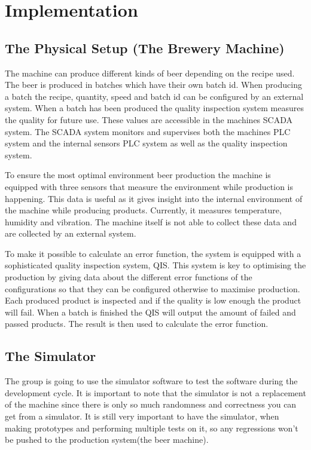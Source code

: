 \section{Implementation}
\subsection{The Physical Setup (The Brewery Machine)}

The machine can produce different kinds of beer depending on the recipe
used. The beer is produced in batches which have their own batch id. When 
producing a batch the recipe, quantity, speed and batch id can be configured by 
an external system. When a batch has been produced the quality inspection system 
measures the quality for future use. These values are accessible in the machines 
SCADA system. The SCADA system monitors and supervises both the machines PLC 
system and the internal sensors PLC system as well as the quality inspection 
system.

To ensure the most optimal environment beer production the 
machine is equipped with three sensors that measure the environment while 
production is happening. This data is useful as it gives insight into the 
internal environment of the machine while producing products. Currently, it 
measures temperature, humidity and vibration. The machine itself is not able to 
collect these data and are collected by an external system.

To make it possible to calculate an error function, the system is 
equipped with a sophisticated quality inspection system, QIS. This system is key to 
optimising the production by giving data about the different error functions of 
the configurations so that they can be configured otherwise to maximise 
production. Each produced product is inspected and if the quality is low enough
the product will fail. When a batch is finished the QIS will output the amount 
of failed and passed products. The result is then used to calculate the error
function.


\subsection{The Simulator}
The group is going to use the simulator software to test the software during the
development cycle.
It is important to note that the simulator is not a replacement of the machine
since there is only so much randomness and correctness you can get from a 
simulator. 
It is still very important to have the simulator, when making prototypes and 
performing multiple tests on it, so any regressions won't be pushed to 
the production system(the beer machine).


